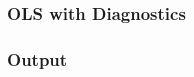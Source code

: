 \documentclass{beamer}
\begin{document}
%
%  
%
%
%  
%
%
%
%  
%
%  
%
%   

\begin{frame}\frametitle{OLS with Diagnostics}

\begin{center}
     \begin{figure}
      \end{figure}      
\end{center}

\end{frame}

\begin{frame}\frametitle{Output}

\begin{center}
     \begin{figure}
      \end{figure}      
\end{center}

\end{frame}
\end{document}
